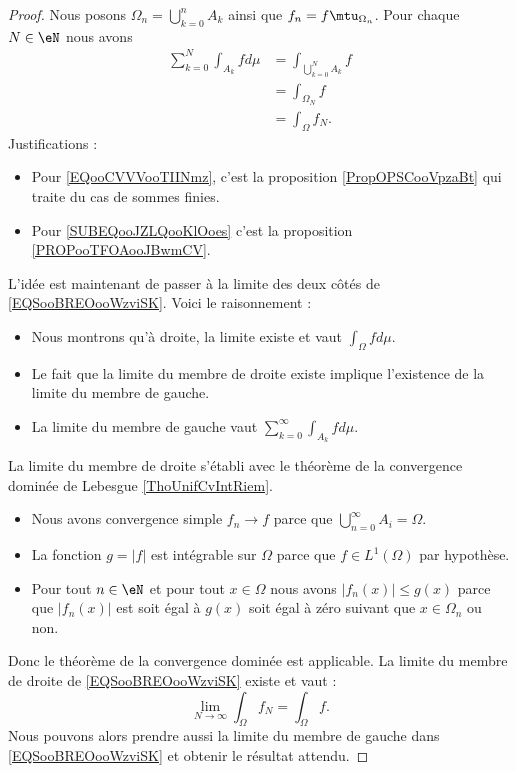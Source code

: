 \begin{proof}
	Nous posons \( \Omega_n=\bigcup_{k=0}^nA_k\) ainsi que \( f_n=f\mtu_{\Omega_n}\). Pour chaque \( N\in \eN\) nous avons
	\begin{subequations}        \label{EQSooBREOooWzviSK}
		\begin{align}
			\sum_{k=0}^N\int_{A_k}fd\mu & =\int_{\bigcup_{k=0}^NA_k}f     \label{EQooCVVVooTIINmz} \\
			                            & =\int_{\Omega_N}f                                        \\
			                            & =\int_{\Omega}f_N.     \label{SUBEQooJZLQooKlOoes}
		\end{align}
	\end{subequations}
	Justifications :
	\begin{itemize}
		\item Pour \eqref{EQooCVVVooTIINmz}, c'est la proposition \ref{PropOPSCooVpzaBt} qui traite du cas de sommes finies.
		\item Pour \eqref{SUBEQooJZLQooKlOoes}  c'est la proposition \ref{PROPooTFOAooJBwmCV}.
	\end{itemize}
	L'idée est maintenant de passer à la limite des deux côtés de \eqref{EQSooBREOooWzviSK}. Voici le raisonnement :
	\begin{itemize}
		\item Nous montrons qu'à droite, la limite existe et vaut \( \int_{\Omega}fd\mu\).
		\item Le fait que la limite du membre de droite existe implique l'existence de la limite du membre de gauche.
		\item La limite du membre de gauche vaut \( \sum_{k=0}^{\infty}\int_{A_k}fd\mu\).
	\end{itemize}
	La limite du membre de droite s'établi avec le théorème de la convergence dominée de Lebesgue \ref{ThoUnifCvIntRiem}.
	\begin{itemize}
		\item Nous avons convergence simple \( f_n\to f\) parce que \( \bigcup_{n=0}^{\infty}A_i=\Omega\).
		\item La fonction \( g=| f |\) est intégrable sur \( \Omega\) parce que \( f\in L^1(\Omega)\) par hypothèse.
		\item Pour tout \( n\in \eN\) et pour tout \( x\in \Omega\) nous avons \( | f_n(x) |\leq g(x)\) parce que \( | f_n(x) |\) est soit égal à \( g(x)\) soit égal à zéro suivant que \( x\in \Omega_n\) ou non.
	\end{itemize}
	Donc le théorème de la convergence dominée est applicable. La limite du membre de droite de \eqref{EQSooBREOooWzviSK} existe et vaut :
	\begin{equation}
		\lim_{N\to \infty} \int_{\Omega}f_N=\int_{\Omega}f.
	\end{equation}
	Nous pouvons alors prendre aussi la limite du membre de gauche dans \eqref{EQSooBREOooWzviSK} et obtenir le résultat attendu.
\end{proof}

